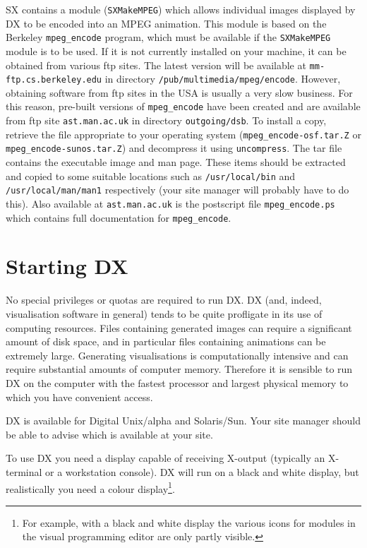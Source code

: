SX contains a module ({\tt{SXMakeMPEG}}) which allows individual images
displayed by DX to be encoded into an MPEG animation.  This module is
based on the Berkeley {\tt{mpeg\_encode}} program, which must be available
if the {\tt{SXMakeMPEG}} module is to be used.  If it is not currently
installed on your machine, it can be obtained from various ftp sites.  The
latest version  will be available at {\tt mm-ftp.cs.berkeley.edu} in
directory {\tt{/pub/multimedia/mpeg/encode}}.  However, obtaining software
from ftp sites in the USA is usually a very slow business.  For this
reason, pre-built versions of {\tt{mpeg\_encode}} have been created and
are available from ftp site {\tt{ast.man.ac.uk}} in directory
{\tt{outgoing/dsb}}. To install a copy, retrieve the file appropriate to
your operating system ({\tt{mpeg\_encode-osf.tar.Z}} or
{\tt{mpeg\_encode-sunos.tar.Z}}) and decompress it using
{\tt{uncompress}}.  The tar file contains the executable image and man
page.  These items should be extracted and copied to some suitable
locations such as {\tt{/usr/local/bin}} and {\tt{/usr/local/man/man1}}
respectively (your site manager will probably have to do this).  Also
available at {\tt{ast.man.ac.uk}} is the postscript file
{\tt{mpeg\_encode.ps}} which contains full documentation for
{\tt{mpeg\_encode}}.


\section{Starting DX  }

No special privileges or quotas are required to run DX. DX (and, indeed,
visualisation software in general) tends to be quite profligate in its
use of computing resources. Files containing generated images can
require a significant amount of disk space, and in particular files
containing animations can be extremely large. Generating visualisations is 
computationally intensive and can require substantial amounts of computer
memory. Therefore it is sensible to run DX on the computer with the 
fastest processor and largest physical memory to which you have convenient
access.

DX is available for Digital Unix/alpha and Solaris/Sun.  Your site manager
should be able to advise which is available at your site.

To use DX you need a display capable of receiving X-output (typically an
X-terminal or a workstation console). DX will run on a black and white
display, but realistically you need a colour display\footnote{ For
example, with a black and white display the various icons for modules
in the visual programming editor are only partly visible.}.

